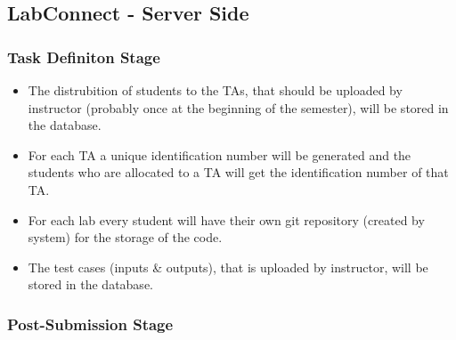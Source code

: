 \documentclass[a4paper, 12pt]{article}
\begin{document}
    \subsection{LabConnect - Server Side}

    \subsubsection{Task Definiton Stage}
    \begin{itemize}
      \item The distrubition of students to the TAs, that should be uploaded by instructor (probably once at the
      beginning of the semester), will be stored in the database.
      \item For each TA a unique identification number will be generated and the students who are allocated to a
      TA will get the identification number of that TA.
      \item For each lab every student will have their own git repository (created by system) for the storage of the
      code.
      \item The test cases (inputs \& outputs), that is uploaded by instructor, will be stored in the database.
    \end{itemize}

    \subsubsection{Post-Submission Stage}
\end{document}

